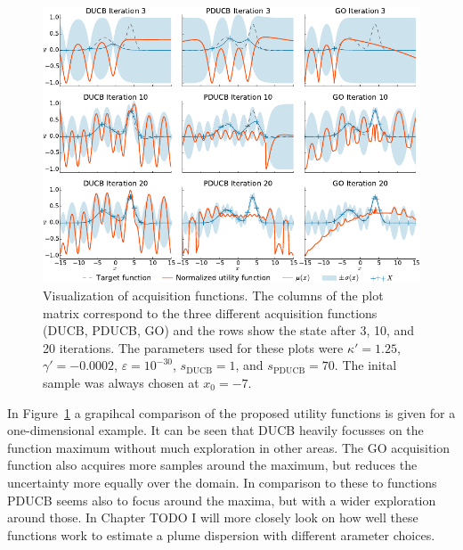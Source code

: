 \documentclass[11pt,a4paper]{scrreprt}
\newcommand{\ped}[1]{_{\mathrm{#1}}}
\begin{document}
\begin{figure}
    \centering
    \includegraphics{plots/acqfns}
    \caption{Visualization of acquisition functions. The columns of the plot 
        matrix correspond to the three different acquisition functions (DUCB, 
        PDUCB, GO) and the rows show the state after 3, 10, and 20 iterations.  
        The parameters used for these plots were $\kappa' = 1.25$, $\gamma' 
        = -0.0002$, $\varepsilon = 10^{-30}$, $s\ped{DUCB} = 1$, and 
        $s\ped{PDUCB} = 70$. The inital sample was always chosen at $x_0 = -7$.}
    \label{fig:acqfns}
\end{figure}
In Figure~\ref{fig:acqfns} a grapihcal comparison of the proposed utility 
functions is given for a one-dimensional example. It can be seen that DUCB 
heavily focusses on the function maximum without much exploration in other 
areas. The GO acquisition function also acquires more samples around the 
maximum, but reduces the uncertainty more equally over the domain. In comparison 
to these to functions PDUCB seems also to focus around the maxima, but with 
a wider exploration around those. In Chapter TODO I will more closely look on 
how well these functions work to estimate a plume dispersion with different 
arameter choices.
\end{document}
